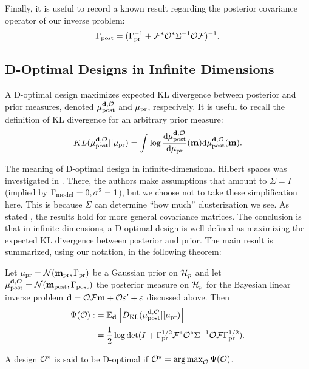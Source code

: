 Finally, it is useful to record a known result regarding the posterior
covariance operator of our inverse problem:
\begin{align}\label{eq:postcov}
  \postcov = (\prcov^{-1} + \fwd^* \obs^* \Sigma^{-1} \obs \fwd
  )^{-1}.
\end{align}


\subsection{D-Optimal Designs in Infinite Dimensions}\label{subsec:D optimal design} 
A D-optimal design maximizes expected KL divergence between posterior
and prior measures, denoted $\mu_{\textup{post}}^{\mathbf{d}, \mathcal{O}}$ and $\mu_{\textup{pr}}$, respecively. It is
useful to recall the definition of KL divergence for an arbitrary
prior measure:
$$
KL(\mu_{\textup{post}}^{\mathbf{d}, \mathcal{O}}||\mu_{\textup{pr}}) = \int \log \frac{\text{\textup{d}} \mu_{\textup{post}}^{\mathbf{d}, \mathcal{O}}}{\text{\textup{d}} \mu_{\textup{pr}}}(\mathbf{m}) \text{\textup{d}} \mu_{\textup{post}}^{\mathbf{d}, \mathcal{O}}(\mathbf{m}).
$$

The meaning of D-optimal design in infinite-dimensional Hilbert spaces
was investigated in \cite{AlexanderianGloorGhattas14}. There, the
authors make assumptions that amount to $\Sigma=I$ (implied by
$\Gamma_{\textup{model}} = 0,\sigma^2=1$), but we choose not to take these
simplification here. This is because $\Sigma$ can determine ``how
much'' clusterization we see. As stated
\cite[pp. 681]{AlexanderianGloorGhattas14}, the results hold for more
general covariance matrices. The conclusion is that in
infinite-dimensions, a D-optimal design is well-defined as maximizing
the expected KL divergence between posterior and prior. The main
result is summarized, using our notation, in the following theorem:
\begin{theorem}\label{thm:d optimality}
  Let $\mu_{\textup{pr}} = \mathcal{N}(\mathbf{m}_{\textup{pr}},\Gamma_{\textup{pr}})$ be a Gaussian prior on $\mathcal{H}_p$
  and let $\mu_{\textup{post}}^{\mathbf{d}, \mathcal{O}} = \mathcal{N}(\mathbf{m}_{\textup{post}},\Gamma_{\textup{post}})$ the posterior measure
  on $\mathcal{H}_p$ for the Bayesian linear inverse problem $\mathbf{d} = \mathcal{O}
  \mathcal{F}\mathbf{m} + \mathcal{O} \varepsilon' + \varepsilon$ discussed above. Then
  \begin{align}\label{eq:objective}
    \begin{split}
      \tar( \obs) :&= \mathbb{E}_{\data}\left [ D_{\text{KL}} (\post || \pr ) \right ] \\
      &= \frac12 \log \det 
      ( I + \prcov^{1/2}  \fwd ^* \obs^* \Sigma^{-1} \obs \fwd \prcov^{1/2}).
    \end{split}
  \end{align}
\end{theorem}
\begin{definition}\label{def:d optimality}
  A design $\mathcal{O}^{\star}$ is said to be D-optimal if $\mathcal{O}^{\star} = \operatorname*{arg\,max}_{\mathcal{O}} \Psi(\mathcal{O})$.
\end{definition}

